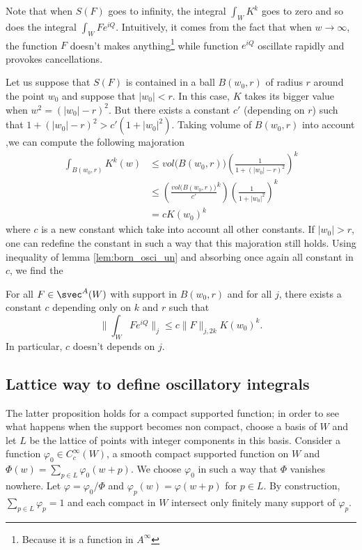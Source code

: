 Note that when $S(F)$ goes to infinity, the integral $\int_WK^k$ goes to zero and so does the integral $\int_WFe^{iQ}$. Intuitively, it comes from the fact that when $w\to\infty$, the function $F$ doesn't makes anything\footnote{Because it is a function in $A^{\infty}$}  while function $e^{iQ}$ oscillate rapidly and provokes cancellations.

Let us suppose that $S(F)$ is contained in a ball $B(w_0,r)$ of radius $r$ around the point $w_0$ and suppose that $| w_0 |<r$. In this case, $K$ takes its bigger value when $w^2=(| w_0 |-r)^2$. But there exists a constant $c'$ (depending on $r$) such that $1+(| w_0 |-r)^2>c'(1+| w_0 |^2)$. Taking volume of $B(w_0,r)$ into account ,we can compute the following majoration
\begin{equation}
\begin{split}
\int_{B(w_0,r)}K^k(w)&\leq vol\big(B(w_0,r)\big)\left( \frac{1}{1+(| w_0 |-r)^2} \right)^k\\
                     &\leq \left( \frac{vol\big( B(w_0,r) \big)}{c'}^k \right)\left( \frac{1}{1+| w_0 |^2} \right)^k\\
                     &=cK(w_0)^k
\end{split}
\end{equation}
where $c$ is a new constant which take into account all other constants. If $| w_0 |>r$, one can redefine the constant in such a way that this majoration still holds. Using inequality of lemma \ref{lem:born_osci_un} and absorbing once again all constant in $c$, we find the

\begin{proposition}
   For all $F\in\svec^A(W)$ with support in $B(w_0,r)$ and for all $j$, there exists a constant $c$ depending only on $k$ and $r$ such that
\begin{equation}
  \| \int_WFe^{iQ} \|_j\leq c\| F \|_{j,2k}K(w_0)^k.
\end{equation}
In particular, $c$ doesn't depends on $j$.
\end{proposition}
 

\subsection{Lattice way to define oscillatory integrals}

The latter proposition holds for a compact supported function; in order to see what happens when the support becomes non compact, choose a basis of $W$ and let $L$ be the lattice of points with integer components in this basis. Consider a function $\varphi_0\in C^{\infty}_c(W)$, a smooth compact supported function on $W$ and $\Phi(w)=\sum_{p\in L}\varphi_0(w+p)$. We choose $\varphi_0$ in such a way that $\Phi$ vanishes nowhere. Let $\varphi=\varphi_0/\Phi$ and $\varphi_p(w)=\varphi(w+p)$ for $p\in L$. By construction, $\sum_{p\in L}\varphi_p=1$ and each compact in $W$ intersect only finitely many support of $\varphi_p$.

